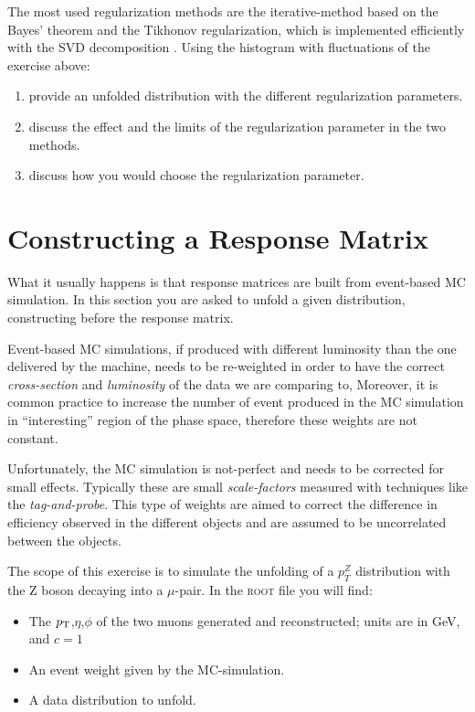 \documentclass[a4paper,11pt]{article}
\begin{document}
The most used regularization methods are the iterative-method based on the Bayes' theorem \cite{dAgostini} and the Tikhonov regularization, which is implemented efficiently with the \gls{SVD} decomposition \cite{SVD}.
Using the histogram with fluctuations of the exercise above:
\begin{enumerate}
	\item provide an unfolded distribution with the different regularization parameters.
	\item discuss the effect and the limits of the regularization parameter in the two methods.
	\item discuss how you would choose the regularization parameter.
\end{enumerate}

\section{Constructing a Response Matrix}

What it usually happens is that response matrices are built from event-based \gls{MC} simulation.
In this section you are asked to unfold a given distribution, constructing before the response matrix.

Event-based \gls{MC} simulations, 
if produced with different luminosity than the one delivered by the machine, needs to be re-weighted 
in order to have the correct \emph{cross-section} and \emph{luminosity} of the data we are comparing to,
Moreover, it is common practice to increase the number of event produced in the \gls{MC} simulation in ``interesting'' 
region of the phase space, therefore these weights are not constant.

Unfortunately, the \gls{MC} simulation is not-perfect and needs to be corrected for small effects.
Typically these are small \emph{scale-factors} measured with techniques like the \emph{tag-and-probe}. 
This type of weights are aimed to correct the difference in efficiency observed in the different objects 
and are assumed to be uncorrelated between the objects.

The scope of this exercise is to simulate the unfolding of a $p_{T}^{Z}$ distribution with the $\mathrm{Z}$ boson decaying into a $\mu$-pair.
In the {\scshape root} file you will find:
\begin{itemize}
	\item The $p_\textup{T}$,$\eta$,$\phi$ of the two muons generated and reconstructed; units are in GeV, and $c=1$
	\item An event weight given by the \gls{MC}-simulation. 
	\item A data distribution to unfold.
\end{itemize}
\end{document}
